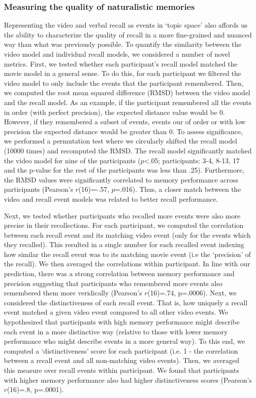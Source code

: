 \documentclass{article}
\begin{document}
{ \subsubsection{Measuring the quality of naturalistic memories}
 Representing the video and verbal recall as events in `topic space' also affords us the ability to characterize the quality of recall in a more fine-grained and nuanced way than what was previously possible. To quantify the similarity between the video model and individual recall models, we considered a number of novel metrics.  First, we tested whether each participant's recall model matched the movie model in a general sense. To do this, for each participant we filtered the video model to only include the events that the participant remembered. Then, we computed the root mean squared difference (RMSD) between the video model and the recall model. As an example, if the participant remembered all the events in order (with perfect precision), the expected distance value would be 0. However, if they remembered a subset of events, events our of order or with low precision the expected distance would be greater than 0. To assess significance, we performed a permutation test where we circularly shifted the recall model (10000 times) and recomputed the RMSD. The recall model significantly matched the video model for nine of the participants ($p$<.05; participants: 3-4, 8-13, 17 and the p-value for the rest of the participants was less than .25). Furthermore, the RMSD values were significantly correlated to memory performance across participants (Pearson's $r$(16)=-.57, $p$=.016). Thus, a closer match between the video and recall event models was related to better recall performance.

 Next, we tested whether participants who recalled more events were also more precise in their recollections. For each participant, we computed the correlation between each recall event and its matching video event (only for the events which they recalled). This resulted in a single number for each recalled event indexing how similar the recall event was to its matching movie event (i.e the `precision' of the recall). We then averaged the correlations within participant. In line with our prediction, there was a strong correlation between memory performance and precision suggesting that participants who remembered more events also remembered them more veridically (Pearson's $r$(16)=.74, p=.0006). Next, we considered the distinctiveness of each recall event. That is, how uniquely a recall event matched a given video event compared to all other video events. We hypothesized that participants with high memory performance might describe each event in a more distinctive way (relative to those with lower memory performance who might describe events in a more general way). To this end, we computed a `distinctiveness' score for each participant (i.e. 1 - the correlation between a recall event and all non-matching video events).  Then, we averaged this measure over recall events within participant.  We found that participants with higher memory performance also had higher distinctiveness scores (Pearson's $r$(16)=.8, p=.0001).

}
\end{document}

